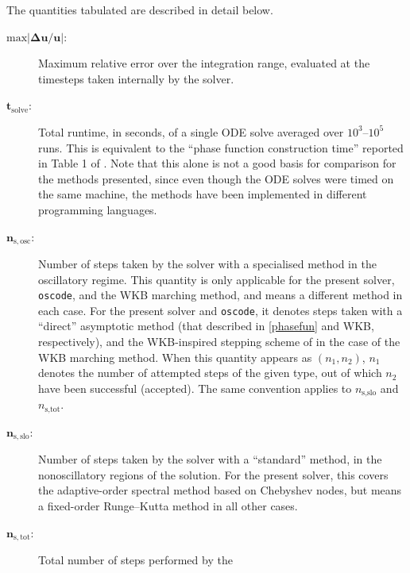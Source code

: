\documentclass[10pt]{article}
\begin{document}
The quantities tabulated are described in detail below.
\begin{description}
    \item[$\bm{\mathrm{max}|\Delta u/u|}$:]{Maximum relative error over the
        integration range, evaluated at the timesteps taken internally by the
        solver.}
    \item[$\bm{t_{\mathrm{solve}}}$:]{Total runtime, in seconds, of a single
        ODE solve averaged over $10^3$--$10^5$ runs. This is equivalent to the
        ``phase function construction time'' reported in Table 1 of
        \cite{bremer2018}. Note that this alone is not a good basis for
        comparison for the methods presented, since even though the ODE solves
        were timed on the same machine, the methods have been implemented in
        different programming languages.}
    \item[$\bm{n_{\mathrm{s,osc}}}$:]{Number of steps taken by the solver with
        a specialised method in the oscillatory regime. This quantity is only
        applicable for the present solver, \texttt{oscode}, and the WKB
        marching method, and means a different  method in each case. For the
        present solver and \texttt{oscode}, it denotes steps taken with a
        ``direct'' asymptotic method (that described in \cref{phasefun} and WKB,
        respectively), and the WKB-inspired stepping scheme of
        \cite{korner2022wkb} in the case of the WKB marching method. When this
        quantity appears as $(n_1, n_2)$, $n_1$ denotes the number of attempted
        steps of the given type, out of which $n_2$ have been successful
        (accepted). The same convention applies to $n_{\text{s,slo}}$ and
        $n_{\text{s,tot}}$.}
    \item[$\bm{n_{\mathrm{s,slo}}}$:]{Number of steps taken by the solver with
        a ``standard'' method, in the nonoscillatory regions of the solution.
        For the present solver, this covers the adaptive-order spectral method
        based on Chebyshev nodes, but means a fixed-order Runge--Kutta method
        in all other cases.}
    \item[$\bm{n_{\mathrm{s,tot}}}$:]{Total number of steps performed by the
}
\end{description}
\end{document}
